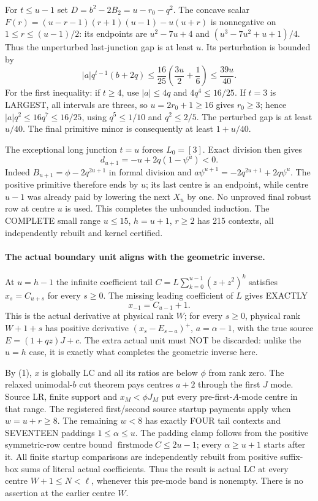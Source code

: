 For $t\le u-1$ set $D=b^2-2B_2=u-r_0-q^2$.
The concave scalar
$F(r)=(u-r-1)(r+1)(u-1)-u(u+r)$ is nonnegative on
$1\le r\le(u-1)/2$: its endpoints are
$u^2-7u+4$ and $(u^3-7u^2+u+1)/4$.
Thus the unperturbed last-junction gap is at least $u$.
Its perturbation is bounded by
\[
 |a|q^{t-1}(b+2q)\le\frac{16}{25}
                         \left(\frac{3u}{2}+\frac16\right)
                         \le\frac{39u}{40}.          \tag{2}
\]
For the first inequality: if $t\ge4$, use $|a|\le4q$ and
$4q^4\le16/25$. If $t=3$ is LARGEST, all intervals are threes,
so $u=2r_0+1\ge16$ gives $r_0\ge3$; hence
$|a|q^2\le16q^7\le16/25$, using $q^5\le1/10$ and
$q^2\le2/5$. The perturbed gap is at least $u/40$.
The final primitive minor is consequently at least $1+u/40$.

The exceptional long junction $t=u$ forces $L_0=[3]$. Exact division
then gives
\[
             d_{u+1}=-u+2q(1-\psi^u)<0.             \tag{3}
\]
Indeed $B_{u+1}=\phi-2q^{2u+1}$ in formal division and
$a\psi^{u+1}=-2q^{2u+1}+2q\psi^u$.
The positive primitive therefore ends by $u$; its last centre is
an endpoint, while centre $u-1$ was already paid by lowering the
next $X_u$ by one. No unproved final robust row at centre $u$
is used. This completes the unbounded induction.
The COMPLETE small range $u\le15$, $h=u+1$, $r\ge2$ has
215 contexts, all independently rebuilt and kernel certified.

\paragraph{The actual boundary unit aligns with the geometric inverse.}
At $u=h-1$ the infinite coefficient tail $C=L\sum_{k=0}^{u-1}
(z+z^2)^k$ satisfies $x_s=C_{u+s}$ for every $s\ge0$.
The missing leading coefficient of $L$ gives EXACTLY
\[
       x_{-1}=C_{u-1}+1.                              \tag{4}
\]
This is the actual derivative at physical rank $W$; for every
$s\ge0$, physical rank $W+1+s$ has positive derivative
$(x_s-E_{s-a})^+$, $a=\alpha-1$, with the true source
$E=(1+qz)J+c$.
The extra actual unit must NOT be discarded: unlike the $u=h$
case, it is exactly what completes the geometric inverse here.

By (1), $x$ is globally LC and all its ratios are below $\phi$
from rank zero. The relaxed unimodal-$b$ cut theorem pays centres
$a+2$ through the first $J$ mode. Source LR, finite support and
$x_M<\phi J_M$ put every pre-first-$A$-mode centre in that range.
The registered first/second source startup payments apply when
$w=u+r\ge8$. The remaining $w<8$ has exactly FOUR tail contexts
and SEVENTEEN paddings $1\le\alpha\le u$. The padding clamp follows
from the positive symmetric-row centre bound
$\operatorname{firstmode}C\le2u-1$; every $\alpha\ge u+1$ starts
after it. All finite startup comparisons are independently rebuilt from
positive suffix-box sums of literal actual coefficients. Thus the result is actual
LC at every centre $W+1\le N<\ell$, whenever this pre-mode band
is nonempty. There is no assertion at the earlier centre $W$.

